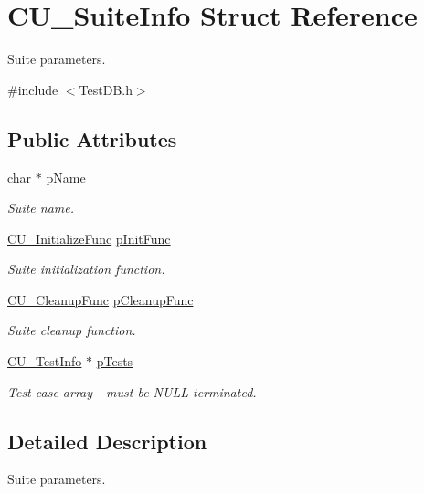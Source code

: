 \hypertarget{struct_c_u___suite_info}{\section{C\+U\+\_\+\+Suite\+Info Struct Reference}
\label{struct_c_u___suite_info}
}


Suite parameters.  




{\ttfamily \#include $<$Test\+D\+B.\+h$>$}

\subsection*{Public Attributes}
\begin{DoxyCompactItemize}
\item 
char $\ast$ \hyperlink{struct_c_u___suite_info_adfd97039a37a46383eba735f20dc4831}{p\+Name}
\begin{DoxyCompactList}\small\item\em Suite name. \end{DoxyCompactList}\item 
\hyperlink{group___framework_gaab4b8ad3aa3a3c222c43c8a330de11e3}{C\+U\+\_\+\+Initialize\+Func} \hyperlink{struct_c_u___suite_info_a2716df9d804ab99c9b84b78b7f951aa2}{p\+Init\+Func}
\begin{DoxyCompactList}\small\item\em Suite initialization function. \end{DoxyCompactList}\item 
\hyperlink{group___framework_ga90966c0bede742195897c3aeff4c342b}{C\+U\+\_\+\+Cleanup\+Func} \hyperlink{struct_c_u___suite_info_a61c244259454b00b3ceb94663ebfbf5a}{p\+Cleanup\+Func}
\begin{DoxyCompactList}\small\item\em Suite cleanup function. \end{DoxyCompactList}\item 
\hyperlink{struct_c_u___test_info}{C\+U\+\_\+\+Test\+Info} $\ast$ \hyperlink{struct_c_u___suite_info_a1fdb8ec9bbc72962dbbc95f156856463}{p\+Tests}
\begin{DoxyCompactList}\small\item\em Test case array -\/ must be N\+U\+L\+L terminated. \end{DoxyCompactList}\end{DoxyCompactItemize}


\subsection{Detailed Description}
Suite parameters. 

